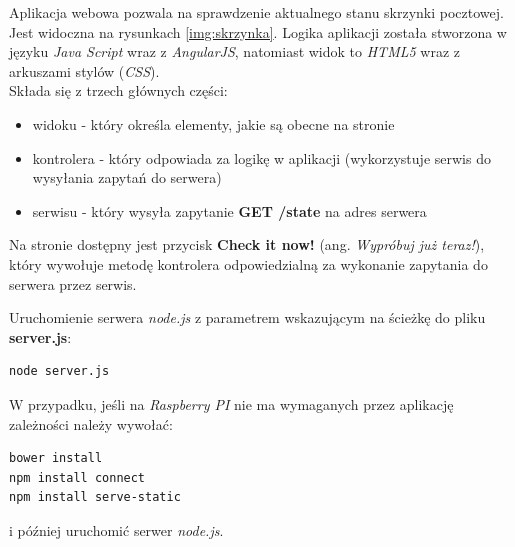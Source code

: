 Aplikacja webowa pozwala na sprawdzenie aktualnego stanu skrzynki pocztowej. Jest widoczna na rysunkach \ref{img:skrzynka}.
Logika aplikacji została stworzona w języku \textit{Java Script} wraz z \textit{AngularJS}, natomiast widok to \textit{HTML5} wraz z arkuszami stylów (\textit{CSS}).\\

Składa się z trzech głównych części:
\begin{itemize}
\item widoku - który określa elementy, jakie są obecne na stronie
\item kontrolera - który odpowiada za logikę w aplikacji (wykorzystuje serwis do wysyłania zapytań do serwera)
\item serwisu - który wysyła zapytanie \textbf{GET /state} na adres serwera
\end{itemize}

Na stronie dostępny jest przycisk \textbf{Check it now!} (ang. \textit{Wypróbuj już teraz!}), który wywołuje metodę kontrolera odpowiedzialną za wykonanie zapytania do serwera przez serwis.

Uruchomienie serwera \textit{node.js} z parametrem wskazującym na ścieżkę do pliku \textbf{server.js}:
\begin{lstlisting}
node server.js
\end{lstlisting}

W przypadku, jeśli na \textit{Raspberry PI} nie ma wymaganych przez aplikację zależności należy wywołać:
\begin{lstlisting}
bower install
npm install connect
npm install serve-static
\end{lstlisting}
i później uruchomić serwer \textit{node.js}.
%

